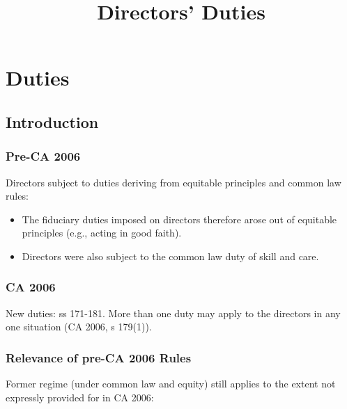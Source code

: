 \documentclass[
]{article}
\title{Directors' Duties}
\author{}
\date{}
\providecommand{\tightlist}{%
  \setlength{\itemsep}{0pt}\setlength{\parskip}{0pt}}
\begin{document}
\maketitle

{
\setcounter{tocdepth}{3}
\tableofcontents
}
\hypertarget{duties}{%
\section{Duties}\label{duties}}

\hypertarget{introduction}{%
\subsection{Introduction}\label{introduction}}

\hypertarget{pre-ca-2006}{%
\subsubsection{Pre-CA 2006}\label{pre-ca-2006}}

Directors subject to duties deriving from equitable principles and
common law rules:

\begin{itemize}
\tightlist
\item
  The fiduciary duties imposed on directors therefore arose out of
  equitable principles (e.g., acting in good faith).
\item
  Directors were also subject to the common law duty of skill and care.
\end{itemize}

\hypertarget{ca-2006}{%
\subsubsection{CA 2006}\label{ca-2006}}

New duties: ss 171-181. More than one duty may apply to the directors in
any one situation (CA 2006, s 179(1)).

\hypertarget{relevance-of-pre-ca-2006-rules}{%
\subsubsection{Relevance of pre-CA 2006
Rules}\label{relevance-of-pre-ca-2006-rules}}

Former regime (under common law and equity) still applies to the extent
not expressly provided for in CA 2006:
\end{document}
